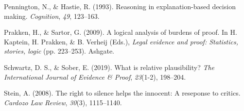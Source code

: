\documentclass[]{book}
\begin{document}
\leavevmode\hypertarget{ref-penn1993}{}%
Pennington, N., \& Hastie, R. (1993). Reasoning in explanation-based decision making. \emph{Cognition}, \emph{49}, 123--163.

\leavevmode\hypertarget{ref-prakken2009}{}%
Prakken, H., \& Sartor, G. (2009). A logical analysis of burdens of proof. In H. Kaptein, H. Prakken, \& B. Verheij (Eds.), \emph{Legal evidence and proof: Statistics, stories, logic} (pp. 223--253). Ashgate.

\leavevmode\hypertarget{ref-schwartz2019WhatRelativePlausibility}{}%
Schwartz, D. S., \& Sober, E. (2019). What is relative plausibility? \emph{The International Journal of Evidence \& Proof}, \emph{23}(1-2), 198--204.

\leavevmode\hypertarget{ref-stein2008}{}%
Stein, A. (2008). The right to silence helps the innocent: A reseponse to critics. \emph{Cardozo Law Review}, \emph{30}(3), 1115--1140.
\end{document}
